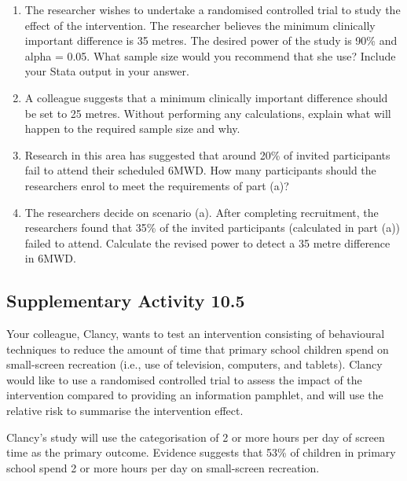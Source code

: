 \documentclass[
  a4paper,
]{memoir}
\providecommand{\tightlist}{%
  \setlength{\itemsep}{0pt}\setlength{\parskip}{0pt}}
\begin{document}
\begin{enumerate}
\def\labelenumi{\alph{enumi})}
\tightlist
\item
  The researcher wishes to undertake a randomised controlled trial to
  study the effect of the intervention. The researcher believes the
  minimum clinically important difference is 35 metres. The desired
  power of the study is 90\% and alpha = 0.05. What sample size would
  you recommend that she use? Include your Stata output in your answer.
\item
  A colleague suggests that a minimum clinically important difference
  should be set to 25 metres. Without performing any calculations,
  explain what will happen to the required sample size and why.
\item
  Research in this area has suggested that around 20\% of invited
  participants fail to attend their scheduled 6MWD. How many
  participants should the researchers enrol to meet the requirements of
  part (a)?
\item
  The researchers decide on scenario (a). After completing recruitment,
  the researchers found that 35\% of the invited participants
  (calculated in part (a)) failed to attend. Calculate the revised power
  to detect a 35 metre difference in 6MWD.
\end{enumerate}

\subsection*{Supplementary Activity
10.5}\label{supplementary-activity-10.5}

Your colleague, Clancy, wants to test an intervention consisting of
behavioural techniques to reduce the amount of time that primary school
children spend on small-screen recreation (i.e., use of television,
computers, and tablets). Clancy would like to use a randomised
controlled trial to assess the impact of the intervention compared to
providing an information pamphlet, and will use the relative risk to
summarise the intervention effect.

Clancy's study will use the categorisation of 2 or more hours per day of
screen time as the primary outcome. Evidence suggests that 53\% of
children in primary school spend 2 or more hours per day on small-screen
recreation.
\end{document}
